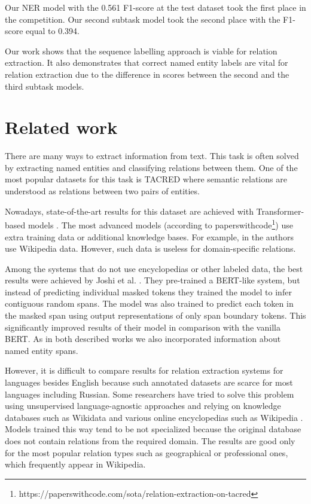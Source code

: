 \documentclass{dialogue}
\begin{document}
	Our NER model with the 0.561 F1-score at the test dataset took the first place in the competition. Our second subtask model took the second place with the F1-score equal to 0.394.
	
	Our work shows that the sequence labelling approach is viable for relation extraction. It also demonstrates that correct named entity labels are vital for relation extraction due to the difference in scores between the second and the third subtask models.
	
	\section{Related work}
	There are many ways to extract information from text. This task is often solved by extracting named entities and classifying relations between them. One of the most popular datasets for this task is TACRED \cite{tacred} where semantic relations are understood as relations between two pairs of entities.
	
	Nowadays, state-of-the-art results for this dataset are achieved with Transformer-based models \cite{attention}. The most advanced models (according to paperswithcode\footnote{https://paperswithcode.com/sota/relation-extraction-on-tacred}) use extra training data or additional knowledge bases. For example, in \cite{BaldiniSoares2019} the authors use Wikipedia data. However, such data is useless for domain-specific relations.
	
	Among the systems that do not use encyclopedias or other labeled data, the best results were achieved by Joshi et al. \cite{spanbert}. They pre-trained a BERT-like system, but instead of predicting individual masked tokens they trained the model to infer contiguous random spans. The model was also trained to predict each token in the masked span using output representations of only span boundary tokens. This significantly improved results of their model in comparison with the vanilla BERT. As in both described works we also incorporated information about named entity spans.
	
	However, it is difficult to compare results for relation extraction systems for languages besides English because such annotated datasets are scarce for most languages including Russian. Some researchers have tried to solve this problem using unsupervised language-agnostic approaches and relying on knowledge databases such as Wikidata and various online encyclopedias such as Wikipedia \cite{Heist2017}. Models trained this way tend to be not specialized because the original database does not contain relations from the required domain. The results are good only for the most popular relation types such as geographical or professional ones, which frequently appear in Wikipedia.
	
\end{document}

